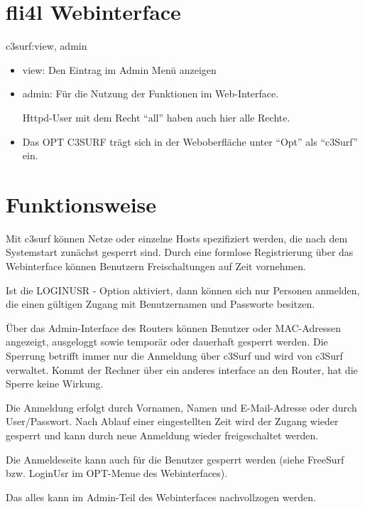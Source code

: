 \section {fli4l Webinterface}

c3surf:view, admin
\begin{itemize}
    \item view: Den Eintrag im Admin Menü anzeigen
    \item admin: Für die Nutzung der Funktionen im Web-Interface.

    Httpd-User mit dem Recht ``all'' haben auch hier alle Rechte.

    \item Das OPT C3SURF trägt sich in der Weboberfläche unter ``Opt'' als ``c3Surf'' ein.
\end{itemize}


\section {Funktionsweise}

Mit c3surf können Netze oder einzelne Hosts spezifiziert werden, die nach
dem Systemstart zunächst gesperrt sind. Durch eine formlose Registrierung
über das Webinterface können Benutzern Freischaltungen auf Zeit vornehmen.
\parskip 12pt

Ist die LOGINUSR - Option aktiviert, dann können sich nur Personen anmelden,
die einen gültigen Zugang mit Benutzernamen und Passworte besitzen.
\parskip 12pt

Über das Admin-Interface des Routers können Benutzer oder MAC-Adressen angezeigt,
ausgeloggt sowie temporär oder dauerhaft gesperrt werden. Die Sperrung betrifft
immer nur die Anmeldung über c3Surf und wird von c3Surf verwaltet. Kommt der
Rechner über ein anderes interface an den Router, hat die Sperre keine Wirkung.
\parskip 12pt

Die Anmeldung erfolgt durch Vornamen, Namen und E-Mail-Adresse oder durch
User/Passwort. Nach Ablauf einer eingestellten Zeit wird der Zugang wieder
gesperrt und kann durch neue Anmeldung wieder freigeschaltet werden.
\parskip 12pt

Die Anmeldeseite kann auch für die Benutzer gesperrt werden (siehe FreeSurf bzw.
LoginUsr im OPT-Menue des Webinterfaces).
\parskip 12pt

Das alles kann im Admin-Teil des Webinterfaces nachvollzogen werden.
\parskip 12pt

